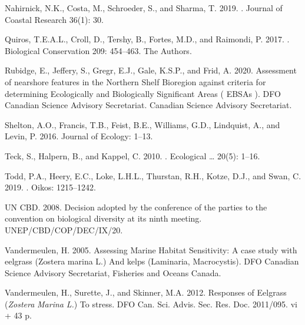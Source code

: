 \documentclass[12pt]{article}\usepackage[]{graphicx}\usepackage[]{color}
\begin{document}
\begin{CSLReferences}{1}{0}
%
Nahirnick, N.K., Costa, M., Schroeder, S., and Sharma, T. 2019. . Journal of Coastal Research 36(1): 30.

%
Quiros, T.E.A.L., Croll, D., Tershy, B., Fortes, M.D., and Raimondi, P. 2017. . Biological Conservation 209: 454--463. {The Authors}.

%
Rubidge, E., Jeffery, S., Gregr, E.J., Gale, K.S.P., and Frid, A. 2020. Assessment of nearshore features in the {Northern Shelf Bioregion} against criteria for determining {Ecologically} and {Biologically Significant Areas} ( {EBSAs} ). DFO Canadian Science Advisory Secretariat. {Canadian Science Advisory Secretariat}.

%
Shelton, A.O., Francis, T.B., Feist, B.E., Williams, G.D., Lindquist, A., and Levin, P. 2016.  Journal of Ecology: 1--13.

%
Teck, S., Halpern, B., and Kappel, C. 2010. . Ecological \ldots{} 20(5): 1--16.

%
Todd, P.A., Heery, E.C., Loke, L.H.L., Thurstan, R.H., Kotze, D.J., and Swan, C. 2019. . Oikos: 1215--1242.

%
UN CBD. 2008. Decision adopted by the conference of the parties to the convention on biological diversity at its ninth meeting. UNEP/CBD/COP/DEC/IX/20.

%
Vandermeulen, H. 2005. Assessing {Marine Habitat Sensitivity}: {A} case study with eelgrass ({Zostera} marina {L}.) And kelps ({Laminaria}, {Macrocystis}). {DFO Canadian Science Advisory Secretariat, Fisheries and Oceans Canada}.

%
Vandermeulen, H., Surette, J., and Skinner, M.A. 2012. Responses of {Eelgrass} ({\emph{Zostera}}{ \emph{Marina} }{\emph{L}}{\emph{.}}) To stress. DFO Can. Sci. Advis. Sec. Res. Doc. 2011/095. vi + 43 p.

\end{CSLReferences}
\end{document}
